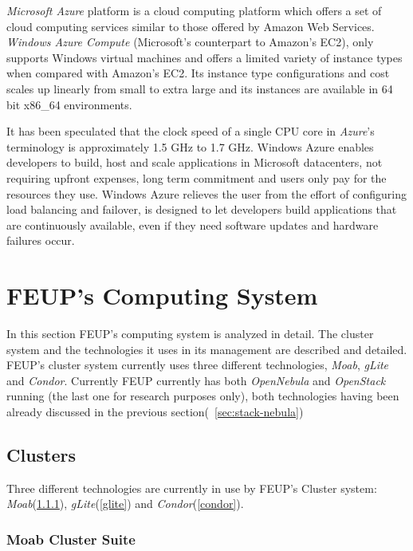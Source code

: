 \textit{Microsoft Azure} platform is a cloud computing platform which offers a set of cloud computing services similar to those offered by Amazon Web Services. \textit{Windows Azure Compute} (Microsoft's counterpart to Amazon's EC2), only supports Windows virtual machines and offers a limited variety of instance types when compared with Amazon's EC2. Its instance type configurations and cost scales up linearly from small to extra large and its instances are available in 64 bit x86\_64 environments. 

It has been speculated that the clock speed of a single CPU core in \textit{Azure}'s terminology is approximately 1.5 GHz to 1.7 GHz.\cite{azure-paper}
Windows Azure enables developers to build, host and scale applications in Microsoft datacenters, not requiring upfront expenses, long term commitment and users only pay for the resources they use. 
Windows Azure relieves the user from the effort of configuring load balancing and failover, is designed to let developers build applications that are continuously available, even if they need software updates and hardware failures occur.\cite{azure}

\section{FEUP's Computing System}\label{feup}

In this section FEUP's computing system is analyzed in detail. The cluster system and the technologies it uses in its management are described and detailed. FEUP's cluster system currently uses three different technologies, \textit{Moab}, \textit{gLite} and \textit{Condor}.
Currently FEUP currently has both \textit{OpenNebula} and \textit{OpenStack} running (the last one for research purposes only), both technologies having been already discussed in the previous section(~\ref{sec:stack-nebula})


\subsection{Clusters}\label{clusters}

Three different technologies are currently in use by FEUP's Cluster system: \textit{Moab}(\ref{moab}), \textit{gLite}(\ref{glite}) and \textit{Condor}(\ref{condor}).

\subsubsection{Moab Cluster Suite}\label{moab}

